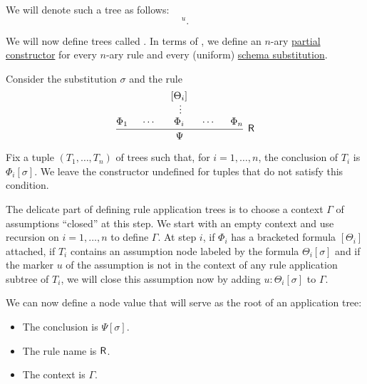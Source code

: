 \begin{definition}
\begin{thmenum}[resume=def:natural_deduction_proof_tree]
    We will denote such a tree as follows:
    \begin{equation*}
      [\varphi]^u.
    \end{equation*}

     We will now define trees called . In terms of , we define an \( n \)-ary \hyperref[thm:least_fixed_point_recursion/base]{partial constructor} for every \( n \)-ary rule and every (uniform) \hyperref[def:uniform_schema_substitution]{schema substitution}.

    Consider the substitution \( \sigma \) and the rule
    \begin{equation*}
      \begin{prooftree}
        \hypo{ \Phi_1 }
        \hypo{ \cdots }
        \hypo{ [\Theta_i] }
        \ellipsis {} { \Phi_i }
        \hypo{ \cdots }
        \hypo{ \Phi_n }
        \infer5[\logic{R}]{ \Psi }
      \end{prooftree}
    \end{equation*}

    Fix a tuple \( (T_1, \ldots, T_n) \) of trees such that, for \( i = 1, \ldots, n \), the conclusion of \( T_i \) is \( \Phi_i[\sigma] \). We leave the constructor undefined for tuples that do not satisfy this condition.

    The delicate part of defining rule application trees is to choose a context \( \Gamma \) of assumptions \enquote{closed} at this step. We start with an empty context and use recursion on \( i = 1, \ldots, n \) to define \( \Gamma \). At step \( i \), if \( \Phi_i \) has a bracketed formula \( [\Theta_i] \) attached, if \( T_i \) contains an assumption node labeled by the formula \( \Theta_i[\sigma] \) and if the marker \( u \) of the assumption is not in the context of any rule application subtree of \( T_i \), we will close this assumption now by adding \( u: \Theta_i[\sigma] \) to \( \Gamma \).

    We can now define a node value that will serve as the root of an application tree:
    \begin{itemize}
      \item The conclusion is \( \Psi[\sigma] \).
      \item The rule name is \( \textsf{R} \).
      \item The context is \( \Gamma \).
    \end{itemize}


\end{thmenum}
\end{definition}
